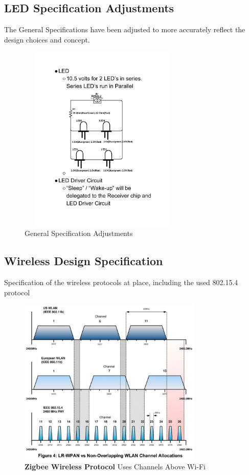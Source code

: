 \documentclass[12pt]{article}
\begin{document}
{{{{		\subsection{LED Specification Adjustments}
			The General Specifications have been adjusted to more accurately reflect the design choices and concept.		
			\begin{figure}[!htb]
				\centering
				\includegraphics[width = 80mm, height = 90mm]{assets/3_General_Specifications.pdf}
				\caption{General Specification Adjustments \label{overflow}}
			\end{figure}
		
		\subsection{Wireless Design Specification}
			Specification of the wireless protocols at place, including the used 802.15.4 protocol
			\begin{figure}[!htb]
				\centering
				\includegraphics[height = 80mm]{assets/Zigbee.png}
				\caption{ \textbf{Zigbee Wireless Protocol} Uses Channels Above Wi-Fi \label{overflow}}
			\end{figure}
	
}}}}
\end{document}
